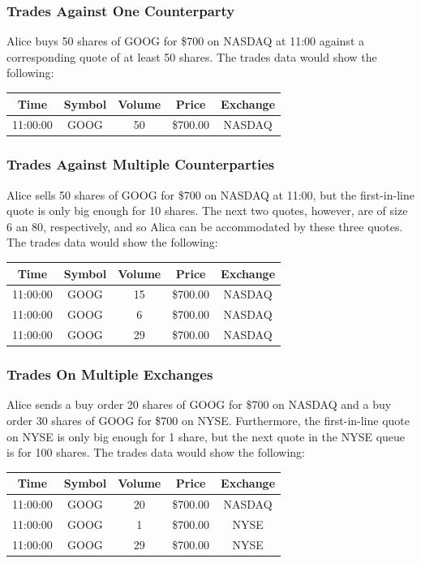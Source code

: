 \documentclass{article}
\begin{document}
\subsubsection{Trades Against One Counterparty}
Alice buys 50 shares of GOOG for \$700 on NASDAQ at 11:00 against a corresponding quote of at least 50 shares. The trades data would show the following:
\begin{center}
  \begin{tabular}{| c | c | c | c | c |}
    \hline
    Time & Symbol & Volume & Price & Exchange \\ \hline
    11:00:00 & GOOG & 50 & \$700.00 & NASDAQ \\
    \hline
  \end{tabular}
\end{center}
\subsubsection{Trades Against Multiple Counterparties}
Alice sells 50 shares of GOOG for \$700 on NASDAQ at 11:00, but the first-in-line quote is only big enough for 10 shares. The next two quotes, however, are of size 6 an 80, respectively, and so Alica can be accommodated by these three quotes. The trades data would show the following:
\begin{center}
  \begin{tabular}{| c | c | c | c | c |}
    \hline
    Time & Symbol & Volume & Price & Exchange \\ \hline
    11:00:00 & GOOG & 15 & \$700.00 & NASDAQ \\ \hline
    11:00:00 & GOOG & 6 & \$700.00 & NASDAQ \\ \hline
    11:00:00 & GOOG & 29 & \$700.00 & NASDAQ \\
    \hline
  \end{tabular}
\end{center}
\subsubsection{Trades On Multiple Exchanges}
Alice sends a buy order 20 shares of GOOG for \$700 on NASDAQ and a buy order 30 shares of GOOG for \$700 on NYSE. Furthermore, the first-in-line quote on NYSE is only big enough for 1 share, but the next quote in the NYSE queue is for 100 shares. The trades data would show the following:
\begin{center}
  \begin{tabular}{| c | c | c | c | c |}
    \hline
    Time & Symbol & Volume & Price & Exchange \\ \hline
    11:00:00 & GOOG & 20 & \$700.00 & NASDAQ \\ \hline
    11:00:00 & GOOG & 1 & \$700.00 & NYSE \\ \hline
    11:00:00 & GOOG & 29 & \$700.00 & NYSE \\
    \hline
  \end{tabular}
\end{center}
\end{document}
